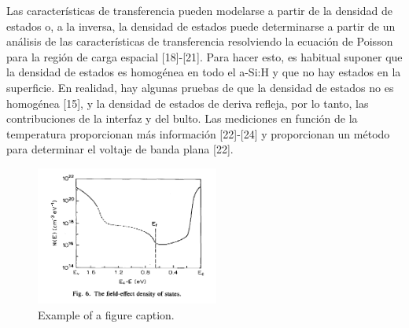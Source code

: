 \documentclass[conference]{IEEEtran}
\begin{document}
    Las características de transferencia pueden modelarse a partir de la densidad de estados o, 
    a la inversa, la densidad de estados puede determinarse a partir de un análisis de las 
    características de transferencia resolviendo la ecuación de Poisson para la región de 
    carga espacial [18]-[21]. Para hacer esto, es habitual suponer que la densidad de estados 
    es homogénea en todo el a-Si:H y que no hay estados en la superficie. En realidad, hay 
    algunas pruebas de que la densidad de estados no es homogénea [15], y la densidad de 
    estados de deriva refleja, por lo tanto, las contribuciones de la interfaz y del bulto.
    Las mediciones en función de la temperatura proporcionan más información [22]-[24] y 
    proporcionan un método para determinar el voltaje de banda plana [22].

\begin{figure}[htbp]
    \centerline{\includegraphics[width=6.0cm]{img/imagen-6.png}}
    \caption{Example of a figure caption.}%
    \label{fig6}
\end{figure} 
    
\end{document}
